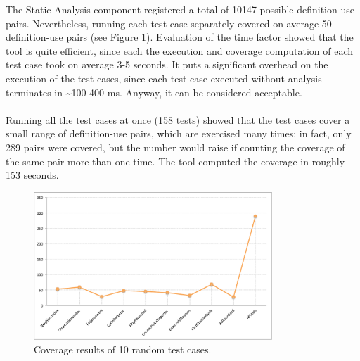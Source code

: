 The Static Analysis component registered a total of 10147 possible definition-use pairs. Nevertheless, running each test case separately covered on average 50 definition-use pairs (see Figure \ref{results}). Evaluation of the time factor showed that the tool is quite efficient, since each the execution and coverage computation of each test case took on average 3-5 seconds. It puts a significant overhead on the execution of the test cases, since each test case executed without analysis terminates in \textasciitilde100-400 ms. Anyway, it can be considered acceptable.

\paragraph{}
Running all the test cases at once (158 tests) showed that the test cases cover a small range of definition-use pairs, which are exercised many times: in fact, only 289 pairs were covered, but the number would raise if counting the coverage of the same pair more than one time. The tool computed the coverage in roughly 153 seconds.

\newpage

\begin{figure}[htb]
  
\centering
  \includegraphics[width=0.8\textwidth]{./Images/tests.pdf}
  \caption{Coverage results of 10 random test cases.}
\label{results}

\end{figure}



